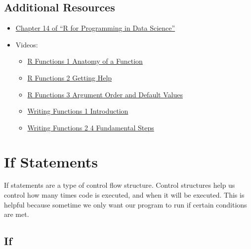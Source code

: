 \documentclass[
]{book}
\providecommand{\tightlist}{%
  \setlength{\itemsep}{0pt}\setlength{\parskip}{0pt}}
\begin{document}
\hypertarget{additional-resources-2}{%
\section{Additional Resources}\label{additional-resources-2}}

\begin{itemize}
\tightlist
\item
  \href{https://bookdown.org/rdpeng/rprogdatascience/functions.html\#the-...-argument}{Chapter 14 of ``R for Programming in Data Science''}
\item
  Videos:

  \begin{itemize}
  \tightlist
  \item
    \href{https://ucr.yuja.com/V/Video?v=2390137\&node=8588230\&a=1409376127\&autoplay=1}{R Functions 1 \textbar{} Anatomy of a Function}
  \item
    \href{https://ucr.yuja.com/V/Video?v=2368890\&node=8488096\&a=1477744713\&autoplay=1}{R Functions 2 \textbar{} Getting Help}
  \item
    \href{https://ucr.yuja.com/V/Video?v=2368889\&node=8488095\&a=762120086\&autoplay=1}{R Functions 3 \textbar{} Argument Order and Default Values}
  \item
    \href{https://ucr.yuja.com/V/Video?v=2700489\&node=9649685\&a=1404409900\&autoplay=1}{Writing Functions 1 \textbar{} Introduction}
  \item
    \href{https://ucr.yuja.com/V/Video?v=2700492\&node=9649688\&a=604881114\&autoplay=1}{Writing Functions 2 \textbar{} 4 Fundamental Steps}
  \end{itemize}
\end{itemize}

\hypertarget{if-statements}{%
\chapter{If Statements}\label{if-statements}}

If statements are a type of control flow structure. Control structures help us control how many times code is executed, and when it will be executed. This is helpful because sometime we only want our program to run if certain conditions are met.

\hypertarget{if}{%
\section{If}\label{if}}
\end{document}
